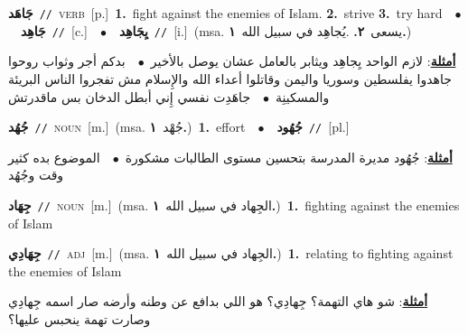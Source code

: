 \documentclass[10pt,a4paper,twoside]{article} %
\begin{document}
\begin{multicols}{2}
{\setlength\topsep{0pt}\textbf{\foreignlanguage{arabic}{جَاهَد}}\ {\color{gray}\texttt{//}\color{black}}\ \textsc{verb}\ [p.]\ \textbf{1.}~fight against the enemies of Islam.  \textbf{2.}~strive  \textbf{3.}~try hard\ \ $\bullet$\ \ \setlength\topsep{0pt}\textbf{\foreignlanguage{arabic}{جَاهِد}}\ {\color{gray}\texttt{//}\color{black}}\ [c.]\ \ $\bullet$\ \ \setlength\topsep{0pt}\textbf{\foreignlanguage{arabic}{يِجَاهِد}}\ {\color{gray}\texttt{//}\color{black}}\ [i.]\ \color{gray}(msa. \foreignlanguage{arabic}{يسعى}~\foreignlanguage{arabic}{\textbf{٢.}}  .\foreignlanguage{arabic}{يُجاهِد في سبيل الله}~\foreignlanguage{arabic}{\textbf{١.}})\color{black}\  \begin{flushright}\color{gray}\foreignlanguage{arabic}{\textbf{\underline{\foreignlanguage{arabic}{أمثلة}}}: لازم الواحد يِجاهِد ويثابر بالعامل عشان يوصل بالأخير\ $\bullet$\ \  بدكم أجر وثواب روحوا جاهدوا يفلسطين وسوريا واليمن وقاتلوا أعداء الله والإِسلام مش تفجروا الناس البريئة والمسكينِة\ $\bullet$\ \  جاهَدِت نفسي إِني أبطل الدخان بس ماقدرتش}\end{flushright}\color{black}} \vspace{2mm}

{\setlength\topsep{0pt}\textbf{\foreignlanguage{arabic}{جُهُد}}\ {\color{gray}\texttt{//}\color{black}}\ \textsc{noun}\ [m.]\ \color{gray}(msa. \foreignlanguage{arabic}{جُهْد}~\foreignlanguage{arabic}{\textbf{١.}})\color{black}\ \textbf{1.}~effort\ \ $\bullet$\ \ \setlength\topsep{0pt}\textbf{\foreignlanguage{arabic}{جُهُود}}\ {\color{gray}\texttt{//}\color{black}}\ [pl.]\  \begin{flushright}\color{gray}\foreignlanguage{arabic}{\textbf{\underline{\foreignlanguage{arabic}{أمثلة}}}: جُهُود مديرة المدرسة بتحسين مستوى الطالبات مشكورة\ $\bullet$\ \  الموضوع بده كثير وقت وجُهُد}\end{flushright}\color{black}} \vspace{2mm}

{\setlength\topsep{0pt}\textbf{\foreignlanguage{arabic}{جِهَاد}}\ {\color{gray}\texttt{//}\color{black}}\ \textsc{noun}\ [m.]\ \color{gray}(msa. \foreignlanguage{arabic}{الجِهاد في سبيل الله}~\foreignlanguage{arabic}{\textbf{١.}})\color{black}\ \textbf{1.}~fighting against the enemies of Islam\ } \vspace{2mm}

{\setlength\topsep{0pt}\textbf{\foreignlanguage{arabic}{جِهَادِي}}\ {\color{gray}\texttt{//}\color{black}}\ \textsc{adj}\ [m.]\ \color{gray}(msa. \foreignlanguage{arabic}{الجِهاد في سبيل الله}~\foreignlanguage{arabic}{\textbf{١.}})\color{black}\ \textbf{1.}~relating to fighting against the enemies of Islam\  \begin{flushright}\color{gray}\foreignlanguage{arabic}{\textbf{\underline{\foreignlanguage{arabic}{أمثلة}}}: شو هاي التهمة؟ جِهادِي؟ هو اللي بدافع عن وطنه وأرضه صار اسمه جِهادِي وصارت تهمة ينحبس عليها؟}\end{flushright}\color{black}} \vspace{2mm}


\end{multicols}
\end{document}
